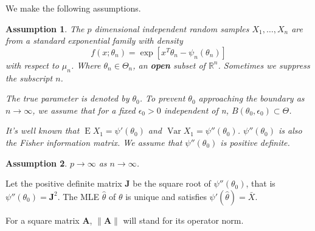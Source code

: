 \documentclass[11pt, letterpaper]{article}
\DeclareMathOperator{\myE}{E}
\DeclareMathOperator{\myVar}{Var}
\newcommand{\BA}{\mathbf{A}}    \newcommand{\BB}{\mathbf{B}}    \newcommand{\BC}{\mathbf{C}}    \newcommand{\BD}{\mathbf{D}}    \newcommand{\BE}{\mathbf{E}}    \newcommand{\BF}{\mathbf{F}}    \newcommand{\BG}{\mathbf{G}}    \newcommand{\BH}{\mathbf{H}}    \newcommand{\BI}{\mathbf{I}}    \newcommand{\BJ}{\mathbf{J}}    \newcommand{\BK}{\mathbf{K}}    \newcommand{\BL}{\mathbf{L}}
\theoremstyle{plain}
\newtheorem{assumption}{\quad\quad Assumption}
\theoremstyle{definition}
\theoremstyle{remark}
\begin{document}
We make the following assumptions.
\begin{assumption}\label{model}
    The $p$ dimensional independent random samples $X_1,\ldots, X_n$ are from a standard exponential family with density
    $$f(x;\theta_n)=\exp[x^T \theta_n-\psi_n(\theta_n)]$$ 
    with respect to $\mu_n$.
    Where $\theta_n\in\Theta_n$, an \textbf{open} subset of $\mathbb{R}^n$.
    Sometimes we suppress the subscript $n$.

    The true parameter is denoted by $\theta_0$.
    {\color{red}To prevent $\theta_0$ approaching the boundary as $n\to \infty$, we assume that for a fixed $\epsilon_0>0$ independent of n, $B(\theta_0,\epsilon_0)\subset \Theta$.}


    It's well known that $\myE X_1=\psi'(\theta_0)$ and $\myVar X_1=\psi''(\theta_0)$. $\psi''(\theta_0)$ is also the Fisher information matrix. We assume that $\psi''(\theta_0)$ is positive definite.
\end{assumption}
\begin{assumption}\label{pAndN}
$p\to \infty$ as $n\to \infty$.
\end{assumption}

Let the positive definite matrix $\BJ$ be the  square root of $\psi''(\theta_0)$, that is $\psi''(\theta_0)=\BJ^2$.
The MLE $\hat{\theta}$ of $\theta$ is unique and satisfies $\psi'(\hat{\theta})=\bar{X}$.

For a square matrix $\BA$, $\|\BA\|$ will stand for its operator norm.
\end{document}
